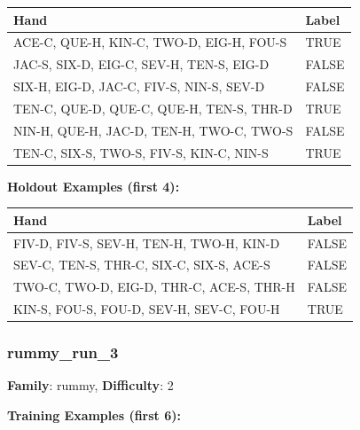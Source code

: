 \documentclass[10pt,a4paper]{article}
\begin{document}
\begin{small}
\begin{tabular}{p{8cm}l}
\toprule
Hand & Label \\
\midrule
ACE-C, QUE-H, KIN-C, TWO-D, EIG-H, FOU-S & \textcolor{positive}{TRUE} \\
JAC-S, SIX-D, EIG-C, SEV-H, TEN-S, EIG-D & \textcolor{negative}{FALSE} \\
SIX-H, EIG-D, JAC-C, FIV-S, NIN-S, SEV-D & \textcolor{negative}{FALSE} \\
TEN-C, QUE-D, QUE-C, QUE-H, TEN-S, THR-D & \textcolor{positive}{TRUE} \\
NIN-H, QUE-H, JAC-D, TEN-H, TWO-C, TWO-S & \textcolor{negative}{FALSE} \\
TEN-C, SIX-S, TWO-S, FIV-S, KIN-C, NIN-S & \textcolor{positive}{TRUE} \\
\bottomrule
\end{tabular}
\end{small}

\textbf{Holdout Examples (first 4):}

\begin{small}
\begin{tabular}{p{8cm}l}
\toprule
Hand & Label \\
\midrule
FIV-D, FIV-S, SEV-H, TEN-H, TWO-H, KIN-D & \textcolor{negative}{FALSE} \\
SEV-C, TEN-S, THR-C, SIX-C, SIX-S, ACE-S & \textcolor{negative}{FALSE} \\
TWO-C, TWO-D, EIG-D, THR-C, ACE-S, THR-H & \textcolor{negative}{FALSE} \\
KIN-S, FOU-S, FOU-D, SEV-H, SEV-C, FOU-H & \textcolor{positive}{TRUE} \\
\bottomrule
\end{tabular}
\end{small}

\vspace{0.5cm}

\subsubsection{rummy\_run\_3}

\textbf{Family}: rummy, \textbf{Difficulty}: 2

\textbf{Training Examples (first 6):}
\end{document}
